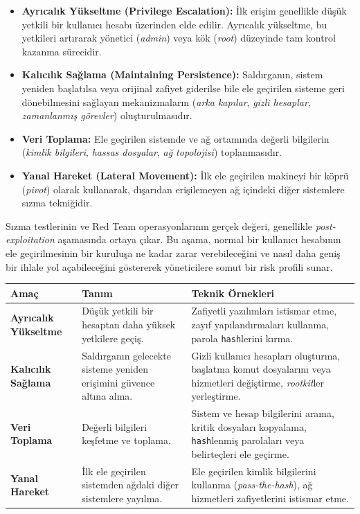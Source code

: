 \begin{itemize}
\item \textbf{Ayrıcalık Yükseltme (Privilege Escalation):} İlk erişim genellikle düşük yetkili bir kullanıcı hesabı üzerinden elde edilir. Ayrıcalık yükseltme, bu yetkileri artırarak yönetici (\textit{admin}) veya kök (\textit{root}) düzeyinde tam kontrol kazanma sürecidir.
\item \textbf{Kalıcılık Sağlama (Maintaining Persistence):} Saldırganın, sistem yeniden başlatılsa veya orijinal zafiyet giderilse bile ele geçirilen sisteme geri dönebilmesini sağlayan mekanizmaların (\textit{arka kapılar}, \textit{gizli hesaplar}, \textit{zamanlanmış görevler}) oluşturulmasıdır.
\item \textbf{Veri Toplama:} Ele geçirilen sistemde ve ağ ortamında değerli bilgilerin (\textit{kimlik bilgileri}, \textit{hassas dosyalar}, \textit{ağ topolojisi}) toplanmasıdır.
\item \textbf{Yanal Hareket (Lateral Movement):} İlk ele geçirilen makineyi bir köprü (\textit{pivot}) olarak kullanarak, dışarıdan erişilemeyen ağ içindeki diğer sistemlere sızma tekniğidir.
\end{itemize}

Sızma testlerinin ve Red Team operasyonlarının gerçek değeri, genellikle \textit{post-exploitation} aşamasında ortaya çıkar. Bu aşama, normal bir kullanıcı hesabının ele geçirilmesinin bir kuruluşa ne kadar zarar verebileceğini ve nasıl daha geniş bir ihlale yol açabileceğini göstererek yöneticilere somut bir risk profili sunar.

\begin{tabular}{|l|l|l|}
\hline
\textbf{Amaç} & \textbf{Tanım} & \textbf{Teknik Örnekleri} \\
\hline
\textbf{Ayrıcalık Yükseltme} & Düşük yetkili bir hesaptan daha yüksek yetkilere geçiş. & Zafiyetli yazılımları istismar etme, zayıf yapılandırmaları kullanma, parola \texttt{hash}lerini kırma. \\
\hline
\textbf{Kalıcılık Sağlama} & Saldırganın gelecekte sisteme yeniden erişimini güvence altına alma. & Gizli kullanıcı hesapları oluşturma, başlatma komut dosyalarını veya hizmetleri değiştirme, \textit{rootkit}ler yerleştirme. \\
\hline
\textbf{Veri Toplama} & Değerli bilgileri keşfetme ve toplama. & Sistem ve hesap bilgilerini arama, kritik dosyaları kopyalama, \texttt{hash}lenmiş parolaları veya belirteçleri ele geçirme. \\
\hline
\textbf{Yanal Hareket} & İlk ele geçirilen sistemden ağdaki diğer sistemlere yayılma. & Ele geçirilen kimlik bilgilerini kullanma (\textit{pass-the-hash}), ağ hizmetleri zafiyetlerini istismar etme. \\
\hline
\end{tabular}

